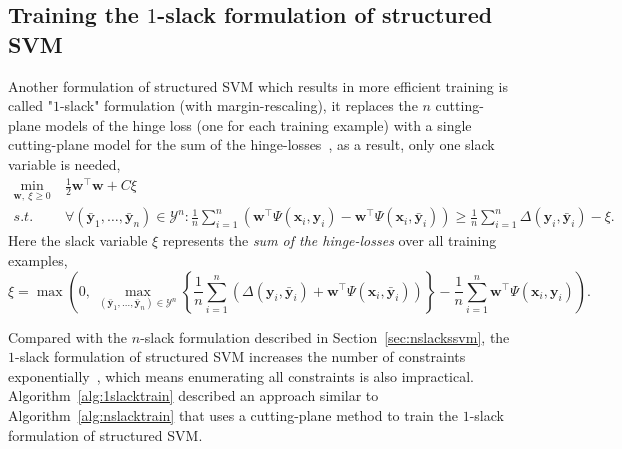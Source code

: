 \subsection{Training the $1$-slack formulation of structured SVM}
\label{sec:1slackssvm}

Another formulation of structured SVM which results in more efficient training is called "$1$-slack" formulation (with margin-rescaling),
it replaces the $n$ cutting-plane models of the hinge loss (one for each training example) with a single cutting-plane model for 
the sum of the hinge-losses~\cite{joachims2009cutting}, as a result, only one slack variable is needed,
\begin{equation}
\label{eq:1slackform}
\begin{aligned}
\min_{\mathbf{w}, ~\xi \ge 0} ~& \frac{1}{2} \mathbf{w}^\top \mathbf{w} + C \xi \\
s.t.~~ ~& \forall(\bar{\mathbf{y}}_1, \dots, \bar{\mathbf{y}}_n) \in \mathcal{Y}^n: 
          \frac{1}{n} \sum_{i=1}^n 
          \left( \mathbf{w}^\top \Psi(\mathbf{x}_i, \mathbf{y}_i) - \mathbf{w}^\top \Psi(\mathbf{x}_i, \bar{\mathbf{y}}_i) \right) \ge
          \frac{1}{n} \sum_{i=1}^n \Delta(\mathbf{y}_i, \bar{\mathbf{y}}_i) - \xi.
\end{aligned}
\end{equation}
Here the slack variable $\xi$ represents the \emph{sum of the hinge-losses} over all training examples,
\begin{equation}
\label{eq:1slackloss}
\xi = \max \left( 0,~ 
      \max_{(\bar{\mathbf{y}}_1, \dots, \bar{\mathbf{y}}_n) \in \mathcal{Y}^n} 
      \left\{ 
      \frac{1}{n} \sum_{i=1}^n \left( \Delta(\mathbf{y}_i, \bar{\mathbf{y}}_i) + \mathbf{w}^\top \Psi(\mathbf{x}_i, \bar{\mathbf{y}}_i) \right)
      \right\} - \frac{1}{n} \sum_{i=1}^n \mathbf{w}^\top \Psi(\mathbf{x}_i, \mathbf{y}_i)
      \right).
\end{equation}


Compared with the $n$-slack formulation described in Section~\ref{sec:nslackssvm}, 
the $1$-slack formulation of structured SVM increases the number of constraints exponentially~\cite{joachims2009cutting},
which means enumerating all constraints is also impractical.
Algorithm~\ref{alg:1slacktrain} described an approach similar to Algorithm~\ref{alg:nslacktrain} that uses a cutting-plane method to 
train the $1$-slack formulation of structured SVM.


